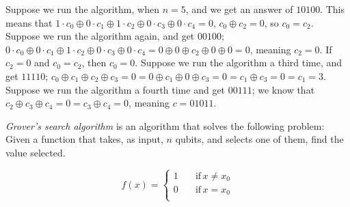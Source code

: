 Suppose we run the algorithm, when $n = 5$, and we get an answer of $1 0 1 0 0$. This means that $1 \cdot c_0 \oplus 0 \cdot c_1 \oplus 1 \cdot c_2 \oplus 0 \cdot c_3 \oplus 0 \cdot c_4 = 0$, $c_0 \oplus c_2 = 0$, so $c_0 = c_2$. Suppose we run the algorithm again, and get $0 0 1 0 0$; $0 \cdot c_0 \oplus 0 \cdot c_1 \oplus 1 \cdot c_2 \oplus 0 \cdot c_3 \oplus 0 \cdot c_4 = 0 \oplus 0 \oplus c_2 \oplus 0 \oplus 0 = 0$, meaning $c_2 = 0$. If $c_2 = 0$ and $c_0 = c_2$, then $c_0 = 0$. Suppose we run the algorithm a third time, and get $1 1 1 1 0$; $c_0 \oplus c_1 \oplus c_2 \oplus c_3 = 0 = 0 \oplus c_1 \oplus 0 \oplus c_3 = 0 = c_1 \oplus c_3 = 0 = c_1 = 3$. Suppose we run the algorithm a fourth time and get $0 0 1 1 1$; we know that $c_2 \oplus c_3 \oplus c_4 = 0 = c_3 \oplus c_4 = 0$, meaning $c = 0 1 0 1 1$.

\begin{definition}
    \emph{Grover's search algorithm} is an algorithm that solves the following problem:\\

    Given a function that takes, as input, $n$ qubits, and selects one of them, find the value selected.

    \begin{equation*}
        f(x)=\begin{cases}
                  1 \quad &\text{if} \, x \neq x_0 \\
                  0 \quad &\text{if} \, x = x_0 \\
             \end{cases}
    \end{equation*}
\end{definition}


